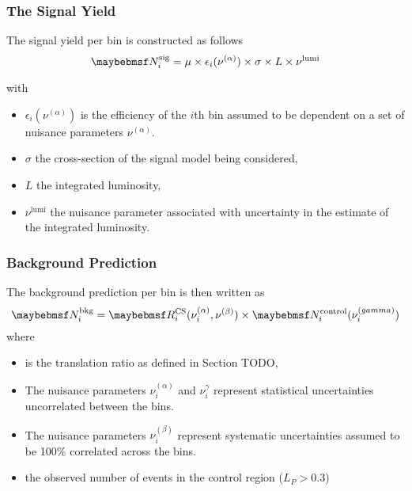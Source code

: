 \subsubsection{The Signal Yield}
The signal yield per bin is constructed as follows
\begin{equation}
\NSigi = \mu \times \epsilon_i(\nu^{(\alpha)}) \times \sigma \times L \times \nu^{\textrm{lumi}}
\end{equation}

with
\begin{itemize}
\item $\epsilon_i(\nu^{(\alpha)})$ is the efficiency of the $i$th bin assumed to be
  dependent on a set of nuisance parameters $\nu^{(\alpha)}$.
\item $\sigma$ the cross-section of the signal model being considered,
\item $L$ the integrated luminosity,
\item $\nu^{\textrm{lumi}}$ the nuisance parameter associated with uncertainty in the
estimate of the integrated luminosity.
\end{itemize}

\subsubsection{Background Prediction}
The background prediction per bin is then written as
\begin{equation}
\NBkgi = \RCSi(\nu_i^{(\alpha)}, \nu^{(\beta)}) \times \NControli(\nu_i^{(\gamma)})
\end{equation}
where
\begin{itemize}
\item \RCSi is the translation ratio as defined in Section TODO,
\item The nuisance parameters $\nu_i^{(\alpha)}$ and $\nu_i^{\gamma}$ represent
  statistical uncertainties uncorrelated between the bins.
\item The nuisance parameters $\nu_i^{(\beta)}$ represent systematic
  uncertainties assumed to be 100\% correlated across the bins.
\item \NControli the observed number of events in the control region
($L_P > 0.3$)
\end{itemize}

